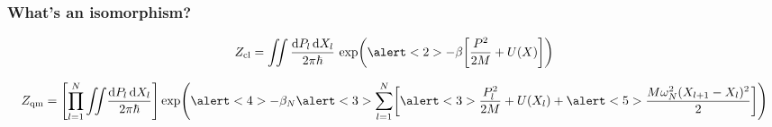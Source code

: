 \documentclass[aspectratio=169]{beamer}
\begin{document}
\begin{frame}
    \frametitle{What's an isomorphism?}


    \[
         Z_{\text{cl}} =   \iint \frac{\dd P_l \dd{X_l}}{2\pi\hbar} \,
             \exp(\alert<2>{-\beta  \qty[
                 \frac{P^2}{2M} + U(X) ]}
             )
    \]
    \begin{overlayarea}{\textwidth}{2em}
        \vspace*{-1em}
        \begin{equation*}
            Z_{\text{qm}}  =
            \qty[ \prod_{l=1}^{N}  \iint \! 
            \frac{\dd P_l \dd{X_l}}{2\pi\hbar} ]
             \exp(
             \alert<4>{-\beta_N}  
             \alert<3>{\sum_{l=1}^{N}} \qty[
                 \alert<3>{\frac{P_l^2}{2M} + U(X_l)} + 
             \alert<5>{\frac{M \omega_N^2 (X_{l+1} - X_l)^{2}}{2}} ]
            )
    \end{equation*}
    \end{overlayarea}

    \vspace*{4em}

    \begin{overlayarea}{\textwidth}{0.4\textheight}
        \begin{center}
        \end{center}
    \end{overlayarea}
\end{frame}
\end{document}

